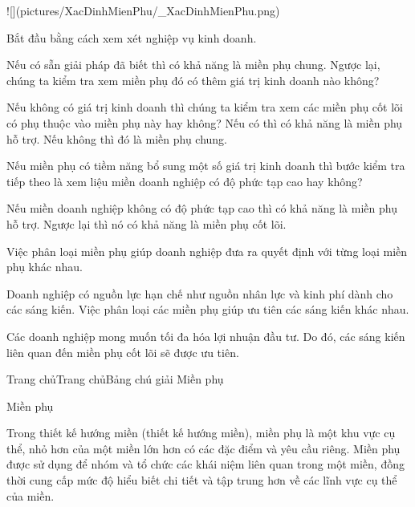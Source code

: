 

![](pictures/XacDinhMienPhu/_XacDinhMienPhu.png)


Bắt đầu bằng cách xem xét nghiệp vụ kinh doanh.

Nếu có sẵn giải pháp đã biết thì có khả năng là miền phụ chung. Ngược lại, chúng ta kiểm tra xem miền phụ đó có thêm giá trị kinh doanh nào không?

Nếu không có giá trị kinh doanh thì chúng ta kiểm tra xem các miền phụ cốt lõi có phụ thuộc vào miền phụ này hay không? Nếu có thì có khả năng là miền phụ hỗ trợ. Nếu không thì đó là miền phụ chung.

Nếu miền phụ có tiềm năng bổ sung một số giá trị kinh doanh thì bước kiểm tra tiếp theo là xem liệu miền doanh nghiệp có độ phức tạp cao hay không?

Nếu miền doanh nghiệp không có độ phức tạp cao thì có khả năng là miền phụ hỗ trợ. Ngược lại thì nó có khả năng là miền phụ cốt lõi.


Việc phân loại miền phụ giúp doanh nghiệp đưa ra quyết định với từng loại miền phụ khác nhau.

Doanh nghiệp có nguồn lực hạn chế như nguồn nhân lực và kinh phí dành cho các sáng kiến. Việc phân loại các miền phụ giúp ưu tiên các sáng kiến khác nhau.

Các doanh nghiệp mong muốn tối đa hóa lợi nhuận đầu tư. Do đó, các sáng kiến liên quan đến miền phụ cốt lõi sẽ được ưu tiên.


%






Trang chủTrang chủBảng chú giải Miền phụ

Miền phụ

Trong thiết kế hướng miền (thiết kế hướng miền), miền phụ là một khu vực cụ thể, nhỏ hơn của một miền lớn hơn có các đặc điểm và yêu cầu riêng. Miền phụ được sử dụng để nhóm và tổ chức các khái niệm liên quan trong một miền, đồng thời cung cấp mức độ hiểu biết chi tiết và tập trung hơn về các lĩnh vực cụ thể của miền.

